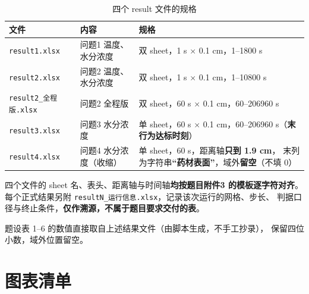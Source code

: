 \begin{table}[H]
  \centering
  \caption{四个 result 文件的规格}
  \label{tab:resultfiles}
  \footnotesize
  \begin{tabularx}{\textwidth}{@{}llX@{}}
    \toprule
    文件 & 内容 & 规格 \\
    \midrule
    \texttt{result1.xlsx} & 问题1 温度、水分浓度
      & 双 sheet，1 s $\times$ 0.1 cm，1--1800 s \\
    \texttt{result2.xlsx} & 问题2 温度、水分浓度
      & 双 sheet，1 s $\times$ 0.1 cm，1--10800 s \\
    \texttt{result2\_全程版.xlsx} & 问题2 全程版
      & 双 sheet，60 s $\times$ 0.1 cm，60--206960 s \\
    \texttt{result3.xlsx} & 问题3 水分浓度
      & 单 sheet，60 s $\times$ 0.1 cm，60--206960 s（\textbf{末行为达标时刻}） \\
    \texttt{result4.xlsx} & 问题4 水分浓度（收缩）
      & 单 sheet，60 s，距离轴\textbf{只到 1.9 cm}，
        末列为字符串\textbf{``药材表面''}，域外\textbf{留空}（不填 0） \\
    \bottomrule
  \end{tabularx}
\end{table}

\noindent 四个文件的 sheet 名、表头、距离轴与时间轴\textbf{均按题目附件3 的模板逐字符对齐}。
每个正式结果另附 \texttt{resultN\_运行信息.xlsx}，记录该次运行的网格、步长、
判据口径与终止条件，\textbf{仅作溯源，不属于题目要求交付的表}。

\noindent 题设表 1--6 的数值直接取自上述结果文件（由脚本生成，不手工抄录），
保留四位小数，域外位置留空。

\section{图表清单}
\setcounter{table}{0}


